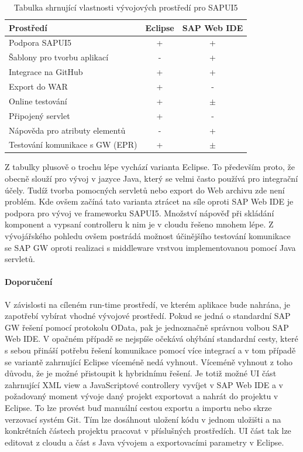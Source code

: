 \documentclass[thesis=M,czech]{FITthesis}[2012/06/26]
\begin{document}
\begin{center}
	\begin{table}[H]
		\centering
		\begin{tabular}{| l | c | c |}
			\hline 
			Prostředí 						& Eclipse 	&	SAP Web IDE \\ 
			\hline	
			\hline
			Podpora SAPUI5					&	+		&	+			\\ 
			\hline
			Šablony pro tvorbu aplikací		&	-		&	+			\\
			\hline
			Integrace na GitHub 			&	+		&	+			\\
			\hline
			Export do WAR					&	+ 		&   -			\\
			\hline
			Online testování 				&	+		&	$\pm$		\\		
			\hline
			Připojený servlet				&	+		&	-			\\
			\hline
			Nápověda pro atributy elementů	&	-		&	+			\\
			\hline		
			Testování komunikace s GW (EPR)	&	+		&	$\pm$		\\
			\hline		
		\end{tabular}
		\caption {Tabulka shrnující vlastnosti vývojových prostředí pro SAPUI5} 
		\label{tab:eclipse_webide_comp}
	\end{table}
\end{center}

Z tabulky plusově o trochu lépe vychází varianta Eclipse. To především proto, že obecně slouží pro vývoj v jazyce Java, který se velmi často používá pro integrační účely. Tudíž tvorba pomocných servletů nebo export do Web archivu zde není problém. Kde ovšem začíná tato varianta ztrácet na síle oproti SAP Web IDE je podpora pro vývoj ve frameworku SAPUI5. Množství nápověď při skládání komponent a vypsaní controlleru k nim je v cloudu řešeno mnohem lépe. Z vývojářského pohledu ovšem postrádá možnost účinějšího testování komunikace se SAP GW oproti realizaci s middleware vrstvou implementovanou pomocí Java servletů. 

\paragraph{Doporučení} 
V závislosti na cíleném run-time prostředí, ve kterém aplikace bude nahrána, je zapotřebí vybírat vhodné vývojové prostředí. Pokud se jedná o standardní SAP GW řešení pomocí protokolu OData, pak je jednoznačně správnou volbou SAP Web IDE. V opačném případě se nejspíše očekává ohýbání standardní cesty, které s sebou přináší potřebu řešení komunikace pomocí více integrací a v tom případě se variantě zahrnující Eclipse víceméně nedá vyhnout. Víceméně vyhnout z toho důvodu, že je možné přistoupit k hybridnímu řešení. Je totiž možné UI část zahrnující XML view a JavaScriptové controllery vyvíjet v SAP Web IDE a v požadovaný moment vývoje daný projekt exportovat a nahrát do projektu v Eclipse. To lze provést buď manuální cestou exportu a importu nebo skrze verzovací systém Git. Tím lze dosáhnout uložení kódu v jednom uložišti a na konkrétních částech projektu pracovat v příslušných prostředích. UI část tak lze editovat z cloudu a část s Java vývojem a exportovacími parametry v Eclipse. 
\end{document}
